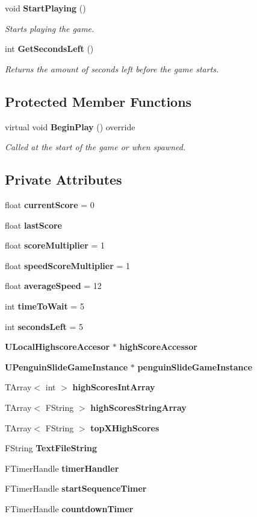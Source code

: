\begin{DoxyCompactItemize}
void \textbf{ Start\+Playing} ()
\begin{DoxyCompactList}\small\item\em Starts playing the game. \end{DoxyCompactList}\item 
int \textbf{ Get\+Seconds\+Left} ()
\begin{DoxyCompactList}\small\item\em Returns the amount of seconds left before the game starts. \end{DoxyCompactList}\end{DoxyCompactItemize}
\subsection*{Protected Member Functions}
\begin{DoxyCompactItemize}
\item 
virtual void \textbf{ Begin\+Play} () override
\begin{DoxyCompactList}\small\item\em Called at the start of the game or when spawned. \end{DoxyCompactList}\end{DoxyCompactItemize}
\subsection*{Private Attributes}
\begin{DoxyCompactItemize}
\item 
float \textbf{ current\+Score} = 0
\item 
float \textbf{ last\+Score}
\item 
float \textbf{ score\+Multiplier} = 1
\item 
float \textbf{ speed\+Score\+Multiplier} = 1
\item 
float \textbf{ average\+Speed} = 12
\item 
int \textbf{ time\+To\+Wait} = 5
\item 
int \textbf{ seconds\+Left} = 5
\item 
\textbf{ U\+Local\+Highscore\+Accesor} $\ast$ \textbf{ high\+Score\+Accessor}
\item 
\textbf{ U\+Penguin\+Slide\+Game\+Instance} $\ast$ \textbf{ penguin\+Slide\+Game\+Instance}
\item 
T\+Array$<$ int $>$ \textbf{ high\+Scores\+Int\+Array}
\item 
T\+Array$<$ F\+String $>$ \textbf{ high\+Scores\+String\+Array}
\item 
T\+Array$<$ F\+String $>$ \textbf{ top\+X\+High\+Scores}
\item 
F\+String \textbf{ Text\+File\+String}
\item 
F\+Timer\+Handle \textbf{ timer\+Handler}
\item 
F\+Timer\+Handle \textbf{ start\+Sequence\+Timer}
\item 
F\+Timer\+Handle \textbf{ countdown\+Timer}
\end{DoxyCompactItemize}


